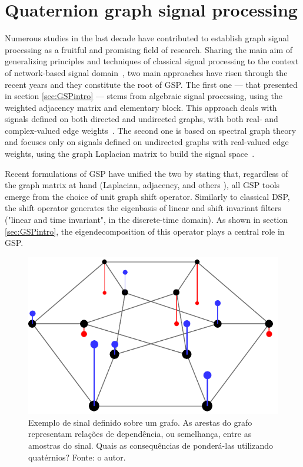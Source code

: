 \chapter{Quaternion graph signal processing}
\label{ch:QGSP}

Numerous studies in the last decade have contributed to establish graph signal processing as a fruitful and promising field of research. Sharing the main aim of generalizing principles and techniques of classical signal processing to the context of network-based signal domain~\cite{ortega2018graph}, two main approaches have risen through the recent years and they constitute the root of GSP. The first one --- that presented in section \ref{sec:GSPintro} --- stems from algebraic signal processing, using the weighted adjacency matrix and elementary block. This approach deals with signals defined on both directed and undirected graphs, with both real- and complex-valued edge weights~\cite{sandryhaila2014big}. The second one is based on spectral graph theory and focuses only on signals defined on undirected graphs with real-valued edge weights, using the graph Laplacian matrix to build the signal space~\cite{shuman2013emerging}.

Recent formulations of GSP have unified the two by stating that, regardless of the graph matrix at hand (Laplacian, adjacency, and others \cite{chen2018shift, dees2019unitary}), all GSP tools emerge from the choice of unit graph shift operator. Similarly to classical DSP, the shift operator generates the eigenbasis of linear and shift invariant filters ("linear and time invariant", in the discrete-time domain).
As shown in section \ref{sec:GSPintro}, the eigendecomposition of this operator plays a central role in GSP.

\begin{figure}
	\centering
	\includegraphics[width=0.3\linewidth]{Figures/signal_duher_graph_2.pdf}
	\caption{Exemplo de sinal definido sobre um grafo. As arestas do grafo representam rela\c c\~oes de depend\^encia, ou semelhan\c ca, entre as amostras do sinal. Quais as consequ\^encias de ponder\'a-las utilizando quat\'ernios? Fonte: o autor.}
	\label{fig:duher}
\end{figure}


